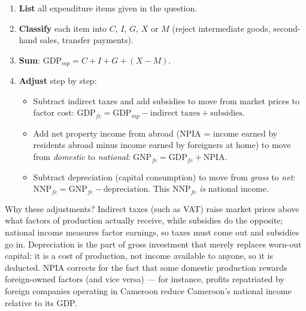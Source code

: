 \documentclass[11pt]{article}
\newcommand{\cle}[1]{{\popxbold\color{popdark}#1}}
\begin{document}
\begin{methode}
\begin{enumerate}
\item \textbf{List} all expenditure items given in the question.
\item \textbf{Classify} each item into $C$, $I$, $G$, $X$ or $M$ (reject intermediate goods, second-hand sales, transfer payments).
\item \textbf{Sum}: $\text{GDP}_{mp} = C + I + G + (X - M)$.
\item \textbf{Adjust} step by step:
\begin{itemize}
\item Subtract \cle{indirect taxes} and add \cle{subsidies} to move from market prices to factor cost: $\text{GDP}_{fc} = \text{GDP}_{mp} - \text{indirect taxes} + \text{subsidies}$.
\item Add \cle{net property income from abroad} (NPIA = income earned by residents abroad minus income earned by foreigners at home) to move from \emph{domestic} to \emph{national}: $\text{GNP}_{fc} = \text{GDP}_{fc} + \text{NPIA}$.
\item Subtract \cle{depreciation} (capital consumption) to move from \emph{gross} to \emph{net}: $\text{NNP}_{fc} = \text{GNP}_{fc} - \text{depreciation}$. This $\text{NNP}_{fc}$ \emph{is} national income.
\end{itemize}
\end{enumerate}
\end{methode}

Why these adjustments? Indirect taxes (such as VAT) raise market prices above what factors of production actually receive, while subsidies do the opposite; national income measures factor earnings, so taxes must come out and subsidies go in. Depreciation is the part of gross investment that merely replaces worn-out capital: it is a cost of production, not income available to anyone, so it is deducted. NPIA corrects for the fact that some domestic production rewards foreign-owned factors (and vice versa) — for instance, profits repatriated by foreign companies operating in Cameroon reduce Cameroon's national income relative to its GDP.
\end{document}
